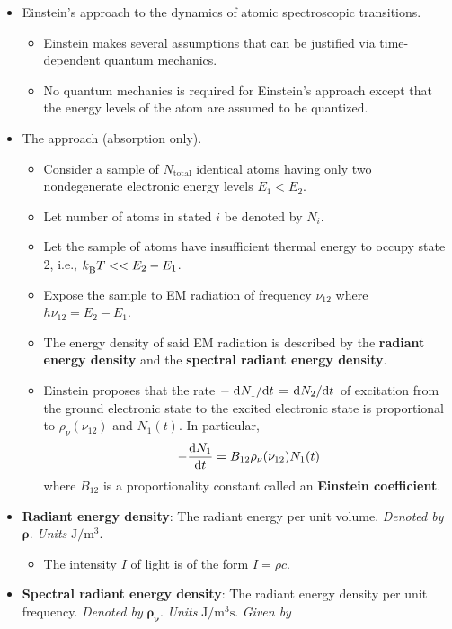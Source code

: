 \documentclass[../notes.tex]{subfiles}
\begin{document}
\begin{itemize}
    \item Einstein's approach to the dynamics of atomic spectroscopic transitions.
    \begin{itemize}
        \item Einstein makes several assumptions that can be justified via time-dependent quantum mechanics.
        \item No quantum mechanics is required for Einstein's approach except that the energy levels of the atom are assumed to be quantized.
    \end{itemize}
    \item The approach (absorption only).
    \begin{itemize}
        \item Consider a sample of $N_\text{total}$ identical atoms having only two nondegenerate electronic energy levels $E_1<E_2$.
        \item Let number of atoms in stated $i$ be denoted by $N_i$.
        \item Let the sample of atoms have insufficient thermal energy to occupy state 2, i.e., $k_\text{B}^{} T<<E_2-E_1$.
        \item Expose the sample to EM radiation of frequency $\nu_{12}$ where $h\nu_{12}=E_2-E_1$.
        \item The energy density of said EM radiation is described by the \textbf{radiant energy density} and the \textbf{spectral radiant energy density}.
        \item Einstein proposes that the rate $-\dv*{N_1}{t}=\dv*{N_2}{t}$ of excitation from the ground electronic state to the excited electronic state is proportional to $\rho_\nu(\nu_{12})$ and $N_1(t)$. In particular,
        \begin{equation*}
            -\dv{N_1}{t} = B_{12}\rho_\nu(\nu_{12})N_1(t)
        \end{equation*}
        where $B_{12}$ is a proportionality constant called an \textbf{Einstein coefficient}.
    \end{itemize}
    \item \textbf{Radiant energy density}: The radiant energy per unit volume. \emph{Denoted by} $\bm{\rho}$. \emph{Units} $\si{\joule\per\cubic\meter}$.
    \begin{itemize}
        \item The intensity $I$ of light is of the form $I=\rho c$.
    \end{itemize}
    \item \textbf{Spectral radiant energy density}: The radiant energy density per unit frequency. \emph{Denoted by} $\bm{\rho_\nu}$. \emph{Units} $\si{\joule\per\cubic\meter\second}$. \emph{Given by}

\end{itemize}
\end{document}
